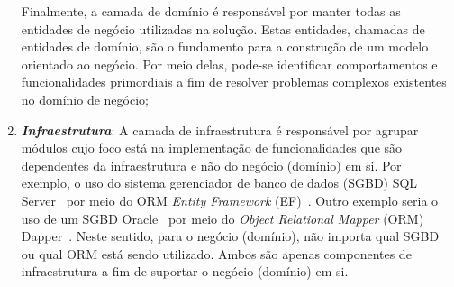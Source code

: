\begin{enumerate}
  Finalmente, a camada de domínio é responsável por manter todas as entidades de negócio utilizadas na solução. Estas entidades, chamadas de entidades de domínio, são o fundamento para a construção de um modelo orientado ao negócio. Por meio delas, pode-se identificar comportamentos e funcionalidades primordiais a fim de resolver problemas complexos existentes no domínio de negócio;
  
  \item
  \textit{\textbf{Infraestrutura}}: A camada de infraestrutura é responsável por agrupar módulos cujo foco está na implementação de funcionalidades que são dependentes da infraestrutura e não do negócio (domínio) em si. Por exemplo, o uso do sistema gerenciador de banco de dados (SGBD) SQL Server~\cite{SQLSERVER-2019} por meio do ORM \textit{Entity Framework} (EF)~\cite{MICROSOFT-2019-Entity-Framework}. Outro exemplo seria o uso de um SGBD Oracle~\cite{ORACLE-2019} por meio do \textit{Object Relational Mapper} (ORM) Dapper~\cite{DAPPER-2019-Site}. Neste sentido, para o negócio (domínio), não importa qual SGBD ou qual ORM está sendo utilizado. Ambos são apenas componentes de infraestrutura a fim de suportar o negócio (domínio) em si.
  
\end{enumerate}